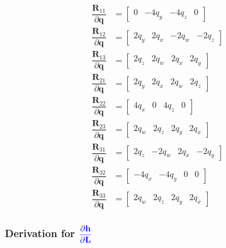 \documentclass{article}
\renewcommand{\Vec}[1]{{\mathbf{#1}}}
\newcommand{\quat}{{\Vec{q}}}
\newcommand{\camRot}{{\Vec{R}}}
\newcommand{\landmarkPos}{{\Vec{L}}}
\newcommand{\projFunc}{{\Vec{h}}}
\begin{document}
\begin{align}
  \dfrac{\camRot_{11}}{\partial{\quat}} &=
    \begin{bmatrix}
    0 & -4q_{y} & -4q_{z} & 0
    \end{bmatrix} \\
  \dfrac{\camRot_{12}}{\partial{\quat}} &=
    \begin{bmatrix}
      2q_{y} & 2q_{x} & -2q_{w} & -2q_{z}
    \end{bmatrix} \\
  \dfrac{\camRot_{13}}{\partial{\quat}} &=
    \begin{bmatrix}
      2q_{z} & 2q_{w} & 2q_{x} & 2q_{y}
    \end{bmatrix} \\
  \dfrac{\camRot_{21}}{\partial{\quat}} &=
  \begin{bmatrix}
    2q_{y} & 2q_{x} & 2q_{w} & 2q_{z}
  \end{bmatrix} \\
  \dfrac{\camRot_{22}}{\partial{\quat}} &=
    \begin{bmatrix}
      4q_{x} & 0 & 4q_{z} & 0
    \end{bmatrix} \\
  \dfrac{\camRot_{23}}{\partial{\quat}} &=
    \begin{bmatrix}
      2q_{w} & 2q_{z} & 2q_{y} & 2q_{x}
    \end{bmatrix} \\
  \dfrac{\camRot_{31}}{\partial{\quat}} &=
    \begin{bmatrix}
      2q_{z} & -2q_{w} & 2q_{x} & -2q_{y}
    \end{bmatrix} \\
  \dfrac{\camRot_{32}}{\partial{\quat}} &=
    \begin{bmatrix}
      -4q_{x} & -4q_{y} & 0 & 0
    \end{bmatrix} \\
  \dfrac{\camRot_{33}}{\partial{\quat}} &=
    \begin{bmatrix}
      2q_{w} & 2q_{z} & 2q_{y} & 2q_{x}
    \end{bmatrix}
\end{align}


\subsubsection*{Derivation for 
$\color{blue} \dfrac{\partial{\projFunc}}{\partial{\landmarkPos}}$}
\end{document}
